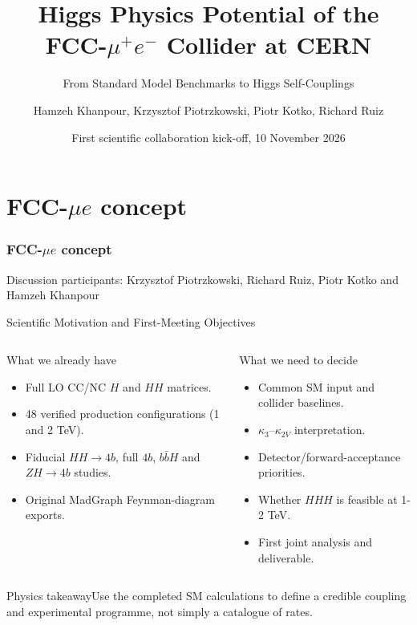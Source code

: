 \documentclass[aspectratio=1610,english]{beamer}
\title[Higgs physics at FCC-$\mu e$]{Higgs Physics Potential of the FCC-$\mu^+e^-$ Collider at CERN}
\subtitle{From Standard Model Benchmarks to Higgs Self-Couplings}
\author[Hamzeh Khanpour]{Hamzeh Khanpour, Krzysztof Piotrzkowski, Piotr Kotko, Richard Ruiz}
\institute[AGH]{AGH University of Krakow}
\date{First scientific collaboration kick-off, 10 November 2026}
\newcommand{\src}[1]{\vfill{\par\color{black!65}\fontsize{6.4}{7.4}\selectfont\emph{Source:} #1\par}}
\newcommand{\key}[1]{\begin{alertblock}{Physics takeaway}\scriptsize #1\end{alertblock}}
\begin{document}
\part{FCC-$\mu e$ concept}
\section{FCC-$\mu e$ concept}




\begin{frame}
\titlepage
\vspace{-0.7em}
\begin{center}\fontsize{7.8}{9}\selectfont Discussion participants: Krzysztof Piotrzkowski, Richard Ruiz, Piotr Kotko and Hamzeh Khanpour\end{center}
\end{frame}



\begin{frame}[t]{Scientific Motivation and First-Meeting Objectives}
\small

\begin{columns}%
\begin{block}{What we already have}
\begin{itemize}
\justifying
\item Full LO CC/NC $H$ and $HH$ matrices.
\item 48 verified production configurations (1 and 2 TeV).
\item Fiducial $HH\to4b$, full $4b$, $b\bar bH$ and $ZH\to4b$ studies.
\item Original MadGraph Feynman-diagram exports.
\end{itemize}\end{block}
\begin{exampleblock}{What we need to decide}
\begin{itemize}
\justifying 
\item Common SM input and collider baselines.
\item $\kappa_3$--$\kappa_{2V}$ interpretation.
\item Detector/forward-acceptance priorities.
\item Whether $HHH$ is feasible at 1-2 TeV.
\item First joint analysis and deliverable.
\end{itemize}\end{exampleblock}
\end{columns}
\key{Use the completed SM calculations to define a credible coupling and experimental programme, not simply a catalogue of rates.}

\end{frame}
\end{document}
